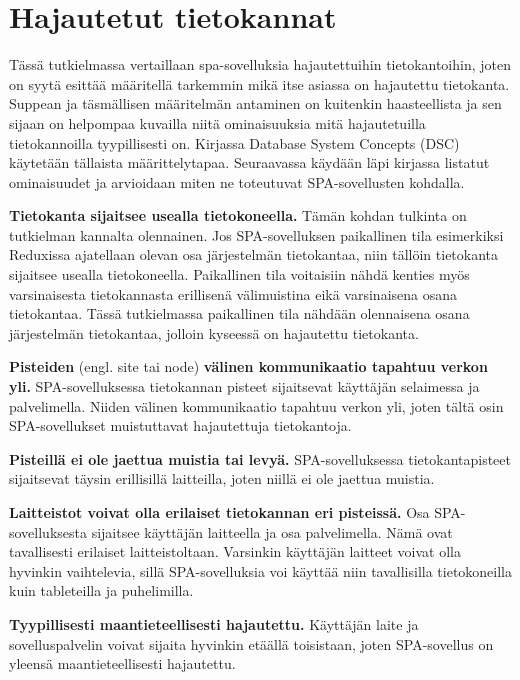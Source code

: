 \documentclass[finnish,twoside,censored,csm,sw-track-2018]{HYthesisML}
\begin{document}
\chapter{Hajautetut tietokannat}

Tässä tutkielmassa vertaillaan spa-sovelluksia hajautettuihin tietokantoihin, joten on syytä esittää määritellä tarkemmin mikä itse asiassa on hajautettu tietokanta. Suppean ja täsmällisen määritelmän antaminen on kuitenkin haasteellista ja sen sijaan on helpompaa kuvailla niitä ominaisuuksia mitä hajautetuilla tietokannoilla tyypillisesti on. Kirjassa Database System Concepts (DSC) \citep{DSC} käytetään tällaista määrittelytapaa. Seuraavassa käydään läpi kirjassa listatut ominaisuudet ja arvioidaan miten ne toteutuvat SPA-sovellusten kohdalla.

\textbf{Tietokanta sijaitsee usealla tietokoneella.} Tämän kohdan tulkinta on tutkielman kannalta olennainen. Jos SPA-sovelluksen paikallinen tila esimerkiksi Reduxissa ajatellaan olevan osa järjestelmän tietokantaa, niin tällöin tietokanta sijaitsee usealla tietokoneella. Paikallinen tila voitaisiin nähdä kenties myös varsinaisesta tietokannasta erillisenä välimuistina eikä varsinaisena osana tietokantaa. Tässä tutkielmassa paikallinen tila nähdään olennaisena osana järjestelmän tietokantaa, jolloin kyseessä on hajautettu tietokanta.
    
\textbf{Pisteiden} (engl. site tai node) \textbf{välinen kommunikaatio tapahtuu verkon yli.} SPA-sovelluksessa tietokannan pisteet sijaitsevat käyttäjän selaimessa ja palvelimella. Niiden välinen kommunikaatio tapahtuu verkon yli, joten tältä osin SPA-sovellukset muistuttavat hajautettuja tietokantoja.

\textbf{Pisteillä ei ole jaettua muistia tai levyä.} SPA-sovelluksessa tietokantapisteet sijaitsevat täysin erillisillä laitteilla, joten niillä ei ole jaettua muistia.

\textbf{Laitteistot voivat olla erilaiset tietokannan eri pisteissä.} Osa SPA-sovelluksesta sijaitsee käyttäjän laitteella ja osa palvelimella. Nämä ovat tavallisesti erilaiset laitteistoltaan. Varsinkin käyttäjän laitteet voivat olla hyvinkin vaihtelevia, sillä SPA-sovelluksia voi käyttää niin tavallisilla tietokoneilla kuin tableteilla ja puhelimilla.
    
\textbf{Tyypillisesti maantieteellisesti hajautettu.} Käyttäjän laite ja sovelluspalvelin voivat sijaita hyvinkin etäällä toisistaan, joten SPA-sovellus on yleensä maantieteellisesti hajautettu.
\end{document}
